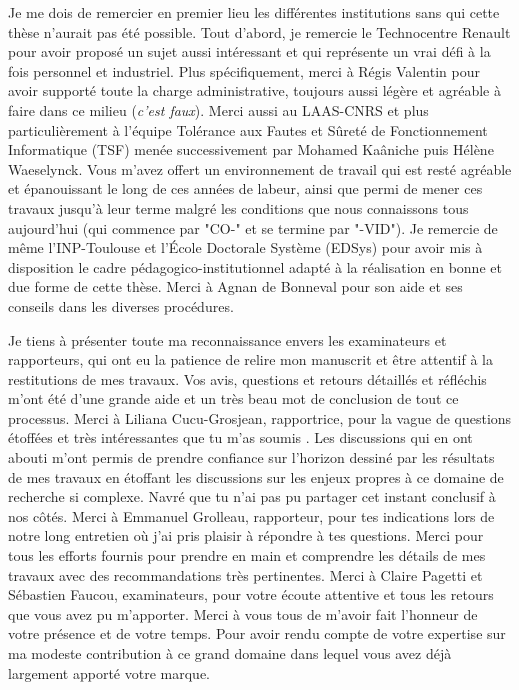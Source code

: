 \documentclass[french, a4paper, 11pt, twoside, pdftex]{StyleThese}
\begin{document}
{	Je me dois de remercier en premier lieu les différentes institutions sans qui cette thèse n'aurait pas été possible. Tout d'abord, je remercie le Technocentre Renault pour avoir proposé un sujet aussi intéressant et qui représente un vrai défi à la fois personnel et industriel. Plus spécifiquement, merci à Régis Valentin pour avoir supporté toute la charge administrative, toujours aussi légère et agréable à faire dans ce milieu (\textit{c'est faux}).  Merci aussi au LAAS-CNRS et plus particulièrement à l'équipe Tolérance aux Fautes et Sûreté de Fonctionnement Informatique (TSF) menée successivement par Mohamed Kaâniche puis Hélène Waeselynck. Vous m'avez offert un environnement de travail qui est resté agréable et épanouissant le long de ces années de labeur, ainsi que permi de mener ces travaux jusqu'à leur terme malgré les conditions que nous connaissons tous aujourd'hui (qui commence par "CO-" et se termine par "-VID"). 
	Je remercie de même l'INP-Toulouse et l'École Doctorale Système (EDSys) pour avoir mis à disposition le cadre pédagogico-institutionnel adapté à la réalisation en bonne et due forme de cette thèse. Merci à Agnan de Bonneval pour son aide et ses conseils dans les diverses procédures. 
	
	Je tiens à présenter toute ma reconnaissance envers les examinateurs et rapporteurs, qui ont eu la patience de relire mon manuscrit et être attentif à la restitutions de mes travaux. Vos avis, questions et retours détaillés et réfléchis m'ont été d'une grande aide et un très beau mot de conclusion de tout ce processus.
	Merci à Liliana Cucu-Grosjean, rapportrice, pour la vague de questions étoffées et très intéressantes que tu m'as soumis . Les discussions qui en ont abouti m'ont permis de prendre confiance sur l'horizon dessiné par les résultats de mes travaux en étoffant les discussions sur les enjeux propres à ce domaine de recherche si complexe. Navré que tu n'ai pas pu partager cet instant conclusif à nos côtés.  
	Merci à Emmanuel Grolleau, rapporteur, pour tes indications lors de notre long entretien où j'ai pris plaisir à répondre à tes questions. Merci pour tous les efforts fournis pour prendre en main et comprendre les détails de mes travaux avec des recommandations très pertinentes. 
	Merci à Claire Pagetti et Sébastien Faucou, examinateurs, pour votre écoute attentive et tous les retours que vous avez pu m'apporter. Merci à vous tous de m'avoir fait l'honneur de votre présence et de votre temps. Pour avoir rendu compte de votre expertise sur ma modeste contribution à ce grand domaine dans lequel vous avez déjà largement apporté votre marque. 
	
}
\end{document}
